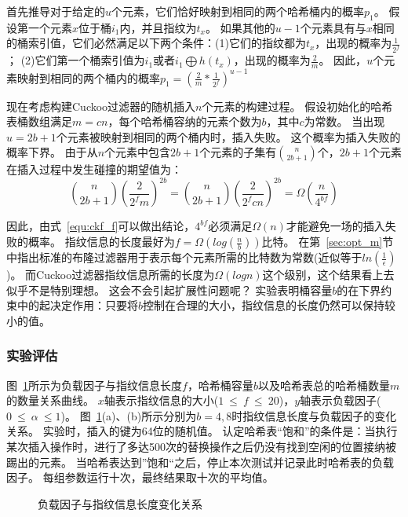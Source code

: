 首先推导对于给定的$u$个元素，它们恰好映射到相同的两个哈希桶内的概率$p_1$。
假设第一个元素$x$位于桶$i_1$内，并且指纹为$t_x$。
如果其他的$u-1$个元素具有与$x$相同的桶索引值，它们必然满足以下两个条件：(1)它们的指纹都为$t_x$，出现的概率为$\frac{1}{2^f}$；
(2)它们第一个桶索引值为$i_1$或者$i_1 \bigoplus h(t_x)$，出现的概率为$\frac{2}{m}$。
因此，$u$个元素映射到相同的两个桶内的概率$p_1 = (\frac{2}{m}\ast \frac{1}{2^f})^{u-1}$

现在考虑构建Cuckoo过滤器的随机插入$n$个元素的构建过程。
假设初始化的哈希表桶数组满足$m = cn$，每个哈希桶容纳的元素个数为$b$，其中$c$为常数。
当出现$u = 2b+1$个元素被映射到相同的两个桶内时，插入失败。
这个概率为插入失败的概率下界。
由于从$n$个元素中包含$2b+1$个元素的子集有$\binom{n}{2b+1}$个，$2b+1$个元素在插入过程中发生碰撞的期望值为：
\begin{equation}
\binom{n}{2b+1}(\frac{2}{2^fm})^{2b} = \binom{n}{2b+1}(\frac{2}{2^f{cn}})^{2b} = \Omega(\frac{n}{4^{bf}}) 
\label{equ:cbf_f}
\end{equation}

因此，由式~\ref{equ:ckf_f}可以做出结论，$4^{bf}$必须满足$\Omega(n)$才能避免一场的插入失败的概率。
指纹信息的长度最好为$f = \Omega(log(\frac{n}{b}))$比特。
在第~\ref{sec:opt_m}节中指出标准的布隆过滤器用于表示每个元素所需的比特数为常数(近似等于$ln(\frac{1}{\epsilon})$)。
而Cuckoo过滤器指纹信息所需的长度为$\Omega(logn)$这个级别，这个结果看上去似乎不是特别理想。
这会不会引起扩展性问题呢？
实验表明桶容量$b$的在下界约束中的起决定作用：只要将$b$控制在合理的大小，指纹信息的长度仍然可以保持较小的值。

\subsubsection{实验评估}
图~\ref{fig:cbf_fingerprint_size}所示为负载因子与指纹信息长度$f$，哈希桶容量$b$以及哈希表总的哈希桶数量$m$的数量关系曲线。
$x$轴表示指纹信息的大小($1~\leq ~f~\leq ~20$)，$y$轴表示负载因子($0~\leq ~\alpha ~\leq 1$)。
图~\ref{fig:cbf_fingerprint_size}(a)、(b)所示分别为$b = 4,8$时指纹信息长度与负载因子的变化关系。
实验时，插入的键为64位的随机值。
认定哈希表“饱和”的条件是：当执行某次插入操作时，进行了多达500次的替换操作之后仍没有找到空闲的位置接纳被踢出的元素。
当哈希表达到”饱和“之后，停止本次测试并记录此时哈希表的负载因子。
每组参数运行十次，最终结果取十次的平均值。
\begin{figure}[htbp]
\centering
{}
\caption{负载因子与指纹信息长度变化关系}
\label{fig:cbf_fingerprint_size}
\end{figure}

